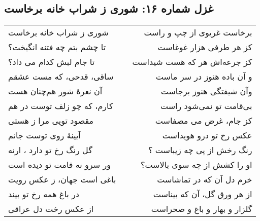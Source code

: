 \begin{center}
\section*{غزل شماره ۱۶: شوری ز شراب خانه برخاست}
\label{sec:016}
\begin{longtable}{l p{0.5cm} r}
شوری ز شراب خانه برخاست
&&
برخاست غریوی از چپ و راست
\\
تا چشم بتم چه فتنه انگیخت؟
&&
کز هر طرفی هزار غوغاست
\\
تا جام لبش کدام می داد؟
&&
کز جرعه‌اش هر که هست شیداست
\\
ساقی، قدحی، که مست عشقم
&&
و آن باده هنوز در سر ماست
\\
آن نعرهٔ شور هم‌چنان هست
&&
وآن شیفتگی هنوز برجاست
\\
کارم، که چو زلف توست در هم
&&
بی‌قامت تو نمی‌شود راست
\\
مقصود تویی مرا ز هستی
&&
کز جام، غرض می مصفاست
\\
آیینهٔ روی توست جانم
&&
عکس رخ تو درو هویداست
\\
گل رنگ رخ تو دارد ، ارنه
&&
رنگ رخش از پی چه زیباست ؟
\\
ور سرو نه قامت تو دیده است
&&
او را کشش از چه سوی بالاست؟
\\
باغی است جهان، ز عکس رویت
&&
خرم دل آن که در تماشاست
\\
در باغ همه رخ تو بیند
&&
از هر ورق گل، آن که بیناست
\\
از عکس رخت دل عراقی
&&
گلزار و بهار و باغ و صحراست
\\
\end{longtable}
\end{center}
